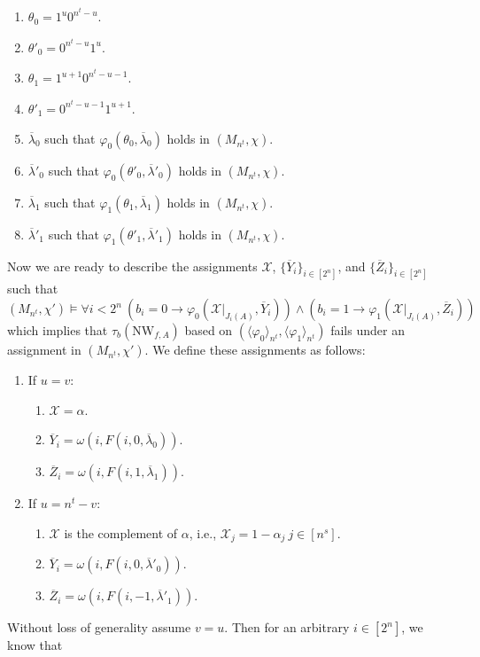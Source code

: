 \begin{enumerate}
\item $\theta_0=1^u0^{n^t-u}$.
\item $\theta'_0=0^{n^t-u}1^u$.
\item $\theta_1=1^{u+1}0^{n^t-u-1}$.
\item $\theta'_1=0^{n^t-u-1}1^{u+1}$.
\item $\overline\lambda_0$ such that $\varphi_0(\theta_0,\overline\lambda_0)$ holds in $(M_{n^t},\chi)$.
\item $\overline\lambda'_0$ such that $\varphi_0(\theta'_0,\overline\lambda'_0)$ holds in $(M_{n^t},\chi)$.
\item $\overline\lambda_1$ such that $\varphi_1(\theta_1,\overline\lambda_1)$ holds in $(M_{n^t},\chi)$.
\item $\overline\lambda'_1$ such that $\varphi_1(\theta'_1,\overline\lambda'_1)$ holds in $(M_{n^t},\chi)$.
\end{enumerate}
Now we are ready to describe the assignments $\mathcal X$, $\{\overline Y_i\}_{i\in[2^n]}$, and $\{\overline Z_i\}_{i\in[2^n]}$ such that
\[(M_{n^t},\chi')\models\forall i<2^n\ (b_i=0\to\varphi_0(\mathcal X|_{J_i(A)},\overline Y_i))\wedge(b_i=1\to\varphi_1(\mathcal X|_{J_i(A)},\overline Z_i))\]
which implies that $\tau_b(\mathrm{NW}_{f,A})$ based on $(\langle\varphi_0\rangle_{n^t},\langle\varphi_1\rangle_{n^t})$ fails under an assignment in $(M_{n^t},\chi')$. We define these assignments as follows:
\begin{enumerate}
\item If $u=v$:
\begin{enumerate}
\item $\mathcal X=\alpha$.
\item $\overline Y_i=\omega(i,F(i,0,\overline\lambda_0))$.
\item $\overline Z_i=\omega(i,F(i,1,\overline\lambda_1))$.
\end{enumerate}
\item If $u=n^t-v$:
\begin{enumerate}
\item $\mathcal X$ is the complement of $\alpha$, i.e., $\mathcal X_j=1-\alpha_j\ j\in[n^s]$.
\item $\overline Y_i=\omega(i,F(i,0,\overline\lambda'_0))$.
\item $\overline Z_i=\omega(i,F(i,-1,\overline\lambda'_1))$.
\end{enumerate}
\end{enumerate}
Without loss of generality assume $v=u$. Then for an arbitrary $i\in[2^n]$, we know that
